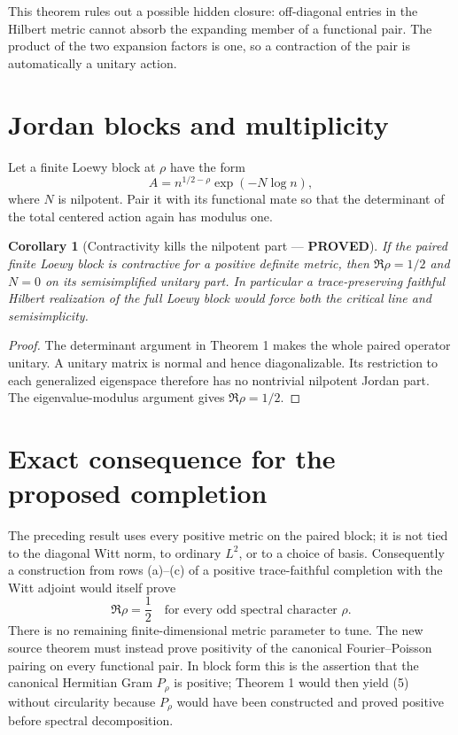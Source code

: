\documentclass[11pt]{article}
\newcommand{\PROVED}{\textcolor{green!40!black}{\textbf{PROVED}}}
\newtheorem{corollary}{Corollary}
\begin{document}
This theorem rules out a possible hidden closure: off-diagonal entries in
the Hilbert metric cannot absorb the expanding member of a functional pair.
The product of the two expansion factors is one, so a contraction of the
pair is automatically a unitary action.

\section{Jordan blocks and multiplicity}

Let a finite Loewy block at $\rho$ have the form
\begin{equation}
 A=n^{1/2-\rho}\exp(-N\log n),                                 \tag{4}
\end{equation}
where $N$ is nilpotent.  Pair it with its functional mate so that the
determinant of the total centered action again has modulus one.

\begin{corollary}[Contractivity kills the nilpotent part --- \PROVED]
If the paired finite Loewy block is contractive for a positive definite
metric, then $\Re\rho=1/2$ and $N=0$ on its semisimplified unitary part.
In particular a trace-preserving faithful Hilbert realization of the full
Loewy block would force both the critical line and semisimplicity.
\end{corollary}

\begin{proof}
The determinant argument in Theorem 1 makes the whole paired operator
unitary.  A unitary matrix is normal and hence diagonalizable.  Its
restriction to each generalized eigenspace therefore has no nontrivial
nilpotent Jordan part.  The eigenvalue-modulus argument gives
$\Re\rho=1/2$.
\end{proof}

\section{Exact consequence for the proposed completion}

The preceding result uses every positive metric on the paired block; it is
not tied to the diagonal Witt norm, to ordinary $L^2$, or to a choice of
basis.  Consequently a construction from rows (a)--(c) of a positive
trace-faithful completion with the Witt adjoint would itself prove
\begin{equation}
 \Re\rho=\frac12\quad\text{for every odd spectral character }\rho. \tag{5}
\end{equation}
There is no remaining finite-dimensional metric parameter to tune.  The
new source theorem must instead prove positivity of the canonical
Fourier--Poisson pairing on every functional pair.  In block form this is
the assertion that the canonical Hermitian Gram $P_\rho$ is positive;
Theorem 1 would then yield (5) without circularity because $P_\rho$ would
have been constructed and proved positive before spectral decomposition.
\end{document}
